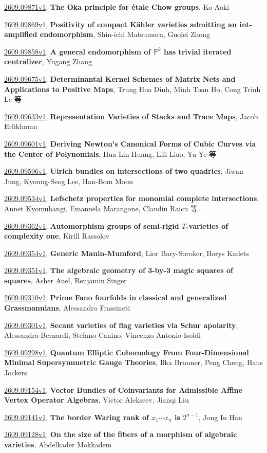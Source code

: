 \documentclass[9pt, a4paper]{article}
\theoremstyle{plain}
\theoremstyle{definition}
\theoremstyle{remark}
\newcommand{\arxiv}[3]{\href{https://arxiv.org/abs/#1}{#1}, \textbf{\textcolor{arxivblue}{#2}}, #3}
\begin{document}
\arxiv{2609.09871v1}{The Oka principle for étale Chow groups}{Ko Aoki}

\arxiv{2609.09869v1}{Positivity of compact Kähler varieties admitting an int-amplified endomorphism}{Shin-ichi Matsumura, Guolei Zhong}

\arxiv{2609.09858v1}{A general endomorphism of $\mathbb{P}^k$ has trivial iterated centralizer}{Yugang Zhang}

\arxiv{2609.09675v1}{Determinantal Kernel Schemes of Matrix Nets and Applications to Positive Maps}{Trung Hoa Dinh, Minh Toan Ho, Cong Trinh Le 等}

\arxiv{2609.09633v1}{Representation Varieties of Stacks and Trace Maps}{Jacob Erlikhman}

\arxiv{2609.09601v1}{Deriving Newton's Canonical Forms of Cubic Curves via the Center of Polynomials}{Hua-Lin Huang, Lili Liao, Yu Ye 等}

\arxiv{2609.09596v1}{Ulrich bundles on intersections of two quadrics}{Jiwan Jung, Kyoung-Seog Lee, Han-Bom Moon}

\arxiv{2609.09534v1}{Lefschetz properties for monomial complete intersections}{Annet Kyomuhangi, Emanuela Marangone, Claudiu Raicu 等}

\arxiv{2609.09362v1}{Automorphism groups of semi-rigid $T$-varieties of complexity one}{Kirill Rassolov}

\arxiv{2609.09354v1}{Generic Manin-Mumford}{Lior Bary-Soroker, Borys Kadets}

\arxiv{2609.09351v1}{The algebraic geometry of 3-by-3 magic squares of squares}{Asher Auel, Benjamin Singer}

\arxiv{2609.09310v1}{Prime Fano fourfolds in classical and generalized Grassmannians}{Alessandro Frassineti}

\arxiv{2609.09301v1}{Secant varieties of flag varieties via Schur apolarity}{Alessandra Bernardi, Stefano Canino, Vincenzo Antonio Isoldi}

\arxiv{2609.09298v1}{Quantum Elliptic Cohomology From Four-Dimensional Minimal Supersymmetric Gauge Theories}{Ilka Brunner, Peng Cheng, Hans Jockers}

\arxiv{2609.09154v1}{Vector Bundles of Coinvariants for Admissible Affine Vertex Operator Algebras}{Victor Alekseev, Jianqi Liu}

\arxiv{2609.09141v1}{The border Waring rank of $x_1\cdots x_n$ is $2^{n-1}$}{Jong In Han}

\arxiv{2609.09128v1}{On the size of the fibers of a morphism of algebraic varieties}{Abdelkader Mokkadem}
\end{document}
